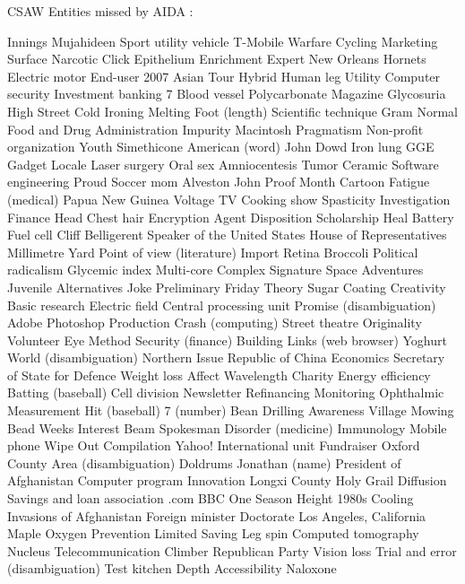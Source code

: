 CSAW Entities missed by AIDA : 
  
Innings  Mujahideen  Sport utility vehicle  
T-Mobile  Warfare  Cycling  
Marketing  Surface  Narcotic  
Click  Epithelium  Enrichment  
Expert  New Orleans Hornets  Electric motor  
End-user  2007 Asian Tour  Hybrid  
Human leg  Utility  Computer security  
Investment banking  7  Blood vessel  
Polycarbonate  Magazine  Glycosuria  
High Street  Cold Ironing  Melting  
Foot (length)  Scientific technique  Gram  
Normal  Food and Drug Administration  Impurity  
Macintosh  Pragmatism  Non-profit organization  
Youth  Simethicone  American (word)  
John Dowd  Iron lung  GGE  
Gadget  Locale  Laser surgery  
Oral sex  Amniocentesis  Tumor  
Ceramic  Software engineering  Proud  
Soccer mom  Alveston  John  
Proof  Month  Cartoon  
Fatigue (medical)  Papua New Guinea  Voltage  
TV Cooking show  Spasticity  Investigation  
Finance  Head  Chest hair  
Encryption  Agent  Disposition  
Scholarship  Heal  Battery  
Fuel cell  Cliff  Belligerent  
Speaker of the United States House of Representatives  Millimetre  Yard  
Point of view (literature)  Import  Retina  
Broccoli  Political radicalism  Glycemic index  
Multi-core  Complex  Signature  
Space Adventures  Juvenile  Alternatives  
Joke  Preliminary  Friday  
Theory  Sugar  Coating  
Creativity  Basic research  Electric field  
Central processing unit  Promise (disambiguation)  Adobe Photoshop  
Production  Crash (computing)  Street theatre  
Originality  Volunteer  Eye  
Method  Security (finance)  Building  
Links (web browser)  Yoghurt  World (disambiguation)  
Northern  Issue  Republic of China  
Economics  Secretary of State for Defence  Weight loss  
Affect  Wavelength  Charity  
Energy efficiency  Batting (baseball)  Cell division  
Newsletter  Refinancing  Monitoring  
Ophthalmic  Measurement  Hit (baseball)  
7 (number)  Bean  Drilling  
Awareness  Village  Mowing  
Bead  Weeks  Interest  
Beam  Spokesman  Disorder (medicine)  
Immunology  Mobile phone  Wipe Out  
Compilation  Yahoo!  International unit  
Fundraiser  Oxford County  Area (disambiguation)  
Doldrums  Jonathan (name)  President of Afghanistan  
Computer program  Innovation  Longxi County  
Holy Grail  Diffusion  Savings and loan association  
.com  BBC One  Season  
Height  1980s  Cooling  
Invasions of Afghanistan  Foreign minister  Doctorate  
Los Angeles, California  Maple  Oxygen  
Prevention  Limited  Saving  
Leg spin  Computed tomography  Nucleus  
Telecommunication  Climber  Republican Party  
Vision loss  Trial and error (disambiguation)  Test kitchen  
Depth  Accessibility  Naloxone  
